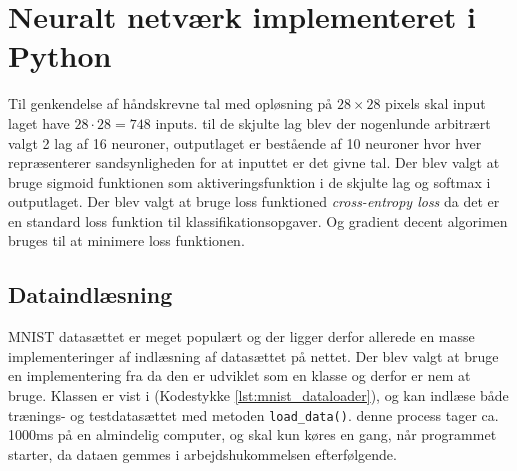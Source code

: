\documentclass{article}
\newcommand{\listingref}[1]{(Kodestykke \ref{#1})}
\begin{document}
\section{Neuralt netværk implementeret i Python}
Til genkendelse af håndskrevne tal med opløsning på $28\times28$ pixels skal input laget have $28\cdot28=748$ inputs. til de skjulte lag blev der nogenlunde arbitrært valgt 2 lag af 16 neuroner, outputlaget er bestående af 10 neuroner hvor hver repræsenterer sandsynligheden for at inputtet er det givne tal. Der blev valgt at bruge sigmoid funktionen som aktiveringsfunktion i de skjulte lag og softmax i outputlaget. Der blev valgt at bruge loss funktioned \textit{cross-entropy loss} da det er en standard loss funktion til klassifikationsopgaver. Og gradient decent algorimen bruges til at minimere loss funktionen.
\subsection{Dataindlæsning}
MNIST datasættet er meget populært og der ligger derfor allerede en masse implementeringer af indlæsning af datasættet på nettet. Der blev valgt at bruge en implementering fra \parencite{Khodabakhsh} da den er udviklet som en klasse og derfor er nem at bruge. Klassen er vist i \listingref{lst:mnist_dataloader}, og kan indlæse både trænings- og testdatasættet med metoden \texttt{load\_data()}. denne process tager ca. 1000ms på en almindelig computer, og skal kun køres en gang, når programmet starter, da dataen gemmes i arbejdshukommelsen efterfølgende. 
\end{document}
